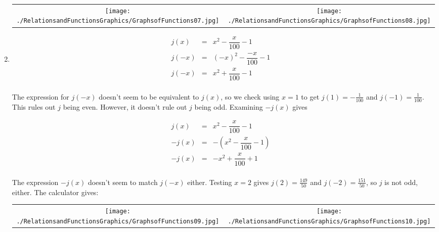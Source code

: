 \begin{ex}
\begin{enumerate}
\begin{center}
\begin{tabular}{cc}
\texttt{[image: ./RelationsandFunctionsGraphics/GraphsofFunctions07.jpg]} \hspace{.75in} & \texttt{[image: ./RelationsandFunctionsGraphics/GraphsofFunctions08.jpg]} \\

\end{tabular}

\end{center}

\setlength{\extrarowheight}{8pt}

\item  \[ \begin{array}{rclr}   

j(x) & = & x^2 - \dfrac{x}{100} - 1 & \\ 
j(-x) & = & (-x)^2 - \dfrac{-x}{100} - 1 & \\   
j(-x) & = & x^2 + \dfrac{x}{100} - 1 & \\   

\end{array} \]

\setlength{\extrarowheight}{2pt}

The expression for $j(-x)$ doesn't seem to be equivalent to $j(x)$, so we check using $x = 1$ to get $j(1) = -\frac{1}{100}$ and $j(-1) = \frac{1}{100}$.  This rules out $j$ being even.  However, it doesn't rule out $j$ being odd.  Examining $-j(x)$ gives

\setlength{\extrarowheight}{8pt}

 \[ \begin{array}{rclr}   

j(x) & = & x^2 - \dfrac{x}{100} - 1 & \\ 
-j(x) & = & -\left(x^2 - \dfrac{x}{100} - 1\right) & \\   
-j(x) & = & -x^2 + \dfrac{x}{100} + 1 & \\   

\end{array} \]

\setlength{\extrarowheight}{2pt}

The expression $-j(x)$ doesn't seem to match $j(-x)$ either.  Testing $x = 2$ gives $j(2) = \frac{149}{50}$ and $j(-2) = \frac{151}{50}$, so $j$ is not odd, either.  The calculator gives:

\begin{center}

\begin{tabular}{cc}

\texttt{[image: ./RelationsandFunctionsGraphics/GraphsofFunctions09.jpg]} \hspace{.75in} & \texttt{[image: ./RelationsandFunctionsGraphics/GraphsofFunctions10.jpg]} \\


\end{tabular}
\end{center}
\end{enumerate}
\end{ex}
